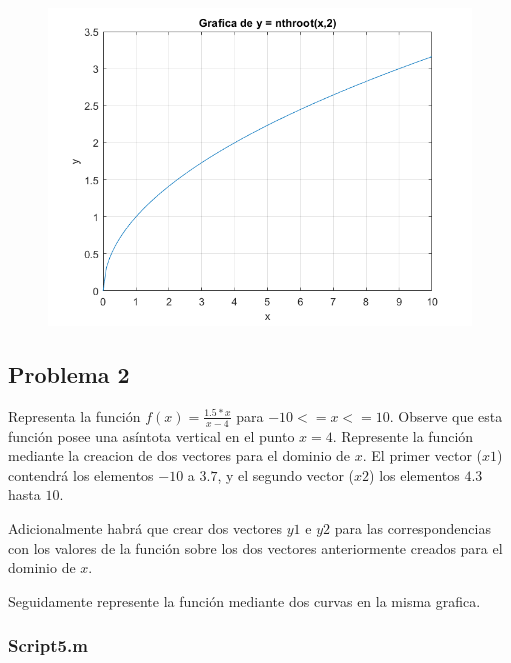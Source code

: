 \documentclass{article}
\begin{document}
	\begin{figure}[h]
		\centering
		\includegraphics[width=\textwidth]{grafica4.png}
	\end{figure}
	
	\subsection{Problema 2}
	
	
	Representa la función $f(x) =  \frac{1.5*x}{x-4}$ para $-10 <= x <= 10$. Observe que esta función posee una asíntota vertical en el punto $x = 4$. Represente la función mediante la creacion de dos vectores para el dominio de $x$. El primer vector ($x1$) contendrá los elementos $-10$ a $3.7$, y el segundo vector ($x2$) los elementos $4.3$ hasta $10$.
	
	Adicionalmente habrá que crear dos vectores $y1$ e $y2$ para las correspondencias con los valores de la función sobre los dos vectores anteriormente creados para el dominio de $x$.
	
	Seguidamente represente la función mediante dos curvas en la misma grafica.
	
	\subsubsection{Script5.m}
	
\end{document}
